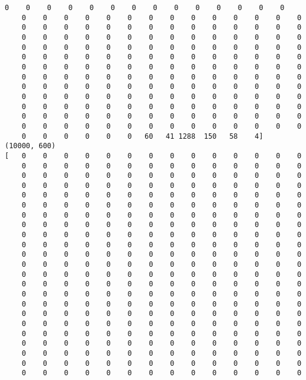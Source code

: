 \documentclass[11pt]{article}
\begin{document}
\begin{Verbatim}[commandchars=\\\{\}]
    0    0    0    0    0    0    0    0    0    0    0    0    0    0
    0    0    0    0    0    0    0    0    0    0    0    0    0    0
    0    0    0    0    0    0    0    0    0    0    0    0    0    0
    0    0    0    0    0    0    0    0    0    0    0    0    0    0
    0    0    0    0    0    0    0    0    0    0    0    0    0    0
    0    0    0    0    0    0    0    0    0    0    0    0    0    0
    0    0    0    0    0    0    0    0    0    0    0    0    0    0
    0    0    0    0    0    0    0    0    0    0    0    0    0    0
    0    0    0    0    0    0    0    0    0    0    0    0    0    0
    0    0    0    0    0    0    0    0    0    0    0    0    0    0
    0    0    0    0    0    0    0    0    0    0    0    0    0    0
    0    0    0    0    0    0    0    0    0    0    0    0    0    0
    0    0    0    0    0    0    0    0    0    0    0    0    0    0
    0    0    0    0    0    0   60   41 1288  150   58    4]
(10000, 600)
[   0    0    0    0    0    0    0    0    0    0    0    0    0    0
    0    0    0    0    0    0    0    0    0    0    0    0    0    0
    0    0    0    0    0    0    0    0    0    0    0    0    0    0
    0    0    0    0    0    0    0    0    0    0    0    0    0    0
    0    0    0    0    0    0    0    0    0    0    0    0    0    0
    0    0    0    0    0    0    0    0    0    0    0    0    0    0
    0    0    0    0    0    0    0    0    0    0    0    0    0    0
    0    0    0    0    0    0    0    0    0    0    0    0    0    0
    0    0    0    0    0    0    0    0    0    0    0    0    0    0
    0    0    0    0    0    0    0    0    0    0    0    0    0    0
    0    0    0    0    0    0    0    0    0    0    0    0    0    0
    0    0    0    0    0    0    0    0    0    0    0    0    0    0
    0    0    0    0    0    0    0    0    0    0    0    0    0    0
    0    0    0    0    0    0    0    0    0    0    0    0    0    0
    0    0    0    0    0    0    0    0    0    0    0    0    0    0
    0    0    0    0    0    0    0    0    0    0    0    0    0    0
    0    0    0    0    0    0    0    0    0    0    0    0    0    0
    0    0    0    0    0    0    0    0    0    0    0    0    0    0
    0    0    0    0    0    0    0    0    0    0    0    0    0    0
    0    0    0    0    0    0    0    0    0    0    0    0    0    0
    0    0    0    0    0    0    0    0    0    0    0    0    0    0
    0    0    0    0    0    0    0    0    0    0    0    0    0    0
    0    0    0    0    0    0    0    0    0    0    0    0    0    0

\end{Verbatim}
\end{document}
